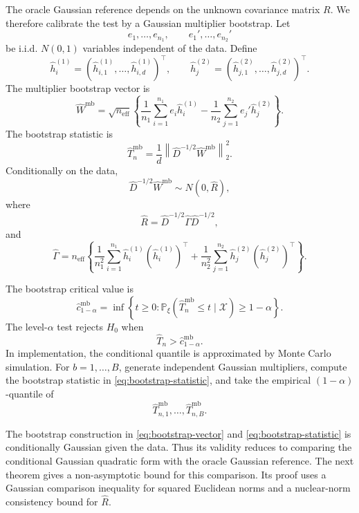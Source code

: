 \documentclass[
  12pt]{article}
\theoremstyle{plain}
\theoremstyle{definition}
\theoremstyle{remark}
\begin{document}
The oracle Gaussian reference depends on the unknown covariance matrix \(R\).
We therefore calibrate the test by a Gaussian multiplier bootstrap.  Let
\[
e_1,\ldots,e_{n_1},
\qquad
e_1',\ldots,e_{n_2}'
\]
be i.i.d. \(N(0,1)\) variables independent of the data.  Define
\[
\widehat h_i^{(1)}
=
(\widehat h_{i,1}^{(1)},\ldots,\widehat h_{i,d}^{(1)})^\top,
\qquad
\widehat h_j^{(2)}
=
(\widehat h_{j,1}^{(2)},\ldots,\widehat h_{j,d}^{(2)})^\top.
\]
The multiplier bootstrap vector is
\begin{equation}
\label{eq:bootstrap-vector}
\widehat W^{\mathrm{mb}}
=
\sqrt{n_{\mathrm{eff}}}
\left\{
\frac1{n_1}\sum_{i=1}^{n_1}e_i\widehat h_i^{(1)}
-
\frac1{n_2}\sum_{j=1}^{n_2}e_j'\widehat h_j^{(2)}
\right\}.
\end{equation}
The bootstrap statistic is
\begin{equation}
\label{eq:bootstrap-statistic}
\widehat T_n^{\mathrm{mb}}
=
\frac1d
\left\|
\widehat D^{-1/2}\widehat W^{\mathrm{mb}}
\right\|_2^2.
\end{equation}
Conditionally on the data,
\[
\widehat D^{-1/2}\widehat W^{\mathrm{mb}}
\sim
N(0,\widehat R),
\]
where
\[
\widehat R
=
\widehat D^{-1/2}\widehat\Gamma\widehat D^{-1/2},
\]
and
\[
\widehat\Gamma
=
n_{\mathrm{eff}}
\left\{
\frac1{n_1^2}\sum_{i=1}^{n_1}
\widehat h_i^{(1)}(\widehat h_i^{(1)})^\top
+
\frac1{n_2^2}\sum_{j=1}^{n_2}
\widehat h_j^{(2)}(\widehat h_j^{(2)})^\top
\right\}.
\]

The bootstrap critical value is
\begin{equation}
\label{eq:bootstrap-critical-value}
\widehat c_{1-\alpha}^{\mathrm{mb}}
=
\inf
\left\{
t\ge0:
\mathbb P_\xi
\left(
\widehat T_n^{\mathrm{mb}}\le t\mid\mathcal X
\right)
\ge 1-\alpha
\right\}.
\end{equation}
The level-\(\alpha\) test rejects \(H_0\) when
\begin{equation}
\label{eq:bootstrap-test}
\widehat T_n>\widehat c_{1-\alpha}^{\mathrm{mb}}.
\end{equation}
In implementation, the conditional quantile is approximated by Monte Carlo
simulation.  For \(b=1,\ldots,B\), generate independent Gaussian multipliers,
compute the bootstrap statistic in \eqref{eq:bootstrap-statistic}, and take the
empirical \((1-\alpha)\)-quantile of
\[
\widehat T_{n,1}^{\mathrm{mb}},\ldots,\widehat T_{n,B}^{\mathrm{mb}}.
\]

The bootstrap construction in \eqref{eq:bootstrap-vector} and
\eqref{eq:bootstrap-statistic} is conditionally Gaussian given the data.  Thus
its validity reduces to comparing the conditional Gaussian quadratic form with
the oracle Gaussian reference.  The next theorem gives a non-asymptotic bound
for this comparison.  Its proof uses a Gaussian comparison inequality for
squared Euclidean norms and a nuclear-norm consistency bound for \(\widehat R\).
\end{document}
